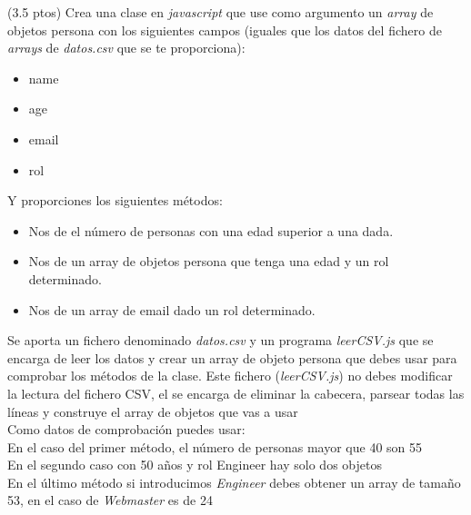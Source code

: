 \documentclass[addpoints,12pt]{exam}
\begin{document}
\begin{center}
\end{center}
\vspace{0.1in}
\begin{questions}
\question(3.5 ptos) Crea una clase en \emph{javascript} que use como argumento un \emph{array} de objetos persona con los siguientes campos (iguales que los datos del fichero de \emph{arrays} de \emph{datos.csv} que se te proporciona):
\begin{itemize}
\item name
\item age
\item email
\item rol
\end{itemize}
Y proporciones los siguientes métodos:
\begin{itemize}
\item Nos de el número de personas con una edad superior a una dada.
\item Nos de un array de objetos persona que tenga una edad y un rol determinado.
\item Nos de un array de email dado un rol determinado.
\end{itemize}
Se aporta un fichero denominado \emph{datos.csv} y un programa \emph{leerCSV.js} que se encarga de leer los datos y crear un array de objeto persona que debes usar para comprobar los métodos de la clase. Este fichero (\emph{leerCSV.js}) no debes modificar la lectura del fichero CSV, el se encarga de eliminar la cabecera, parsear todas las líneas y construye el array de objetos que vas a usar\\
Como datos de comprobación puedes usar:\\
En el caso del primer método, el número de personas mayor que 40 son 55\\
En el segundo caso con 50 años y rol Engineer hay solo dos objetos\\
En el último método si introducimos \emph{Engineer} debes obtener un array de tamaño 53, en el caso de \emph{Webmaster} es de 24


\end{questions}
\end{document}
